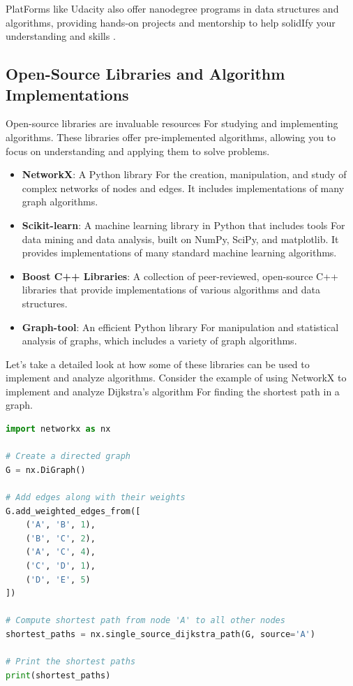 \documentclass[12pt]{book} %
\begin{document}
PlatForms like Udacity also offer nanodegree programs in data structures and algorithms, providing hands-on projects and mentorship to help solidIfy your understanding and skills .

\subsection{Open-Source Libraries and Algorithm Implementations}
Open-source libraries are invaluable resources For studying and implementing algorithms. These libraries offer pre-implemented algorithms, allowing you to focus on understanding and applying them to solve problems.

\begin{itemize}
    \item \textbf{NetworkX}: A Python library For the creation, manipulation, and study of complex networks of nodes and edges. It includes implementations of many graph algorithms.
    \item \textbf{Scikit-learn}: A machine learning library in Python that includes tools For data mining and data analysis, built on NumPy, SciPy, and matplotlib. It provides implementations of many standard machine learning algorithms.
    \item \textbf{Boost C++ Libraries}: A collection of peer-reviewed, open-source C++ libraries that provide implementations of various algorithms and data structures.
    \item \textbf{Graph-tool}: An efficient Python library For manipulation and statistical analysis of graphs, which includes a variety of graph algorithms.
\end{itemize}

Let's take a detailed look at how some of these libraries can be used to implement and analyze algorithms. Consider the example of using NetworkX to implement and analyze Dijkstra's algorithm For finding the shortest path in a graph.

\FloatBarrier
\begin{lstlisting}[language=Python, caption=Using NetworkX to Implement Dijkstra's Algorithm]
import networkx as nx

# Create a directed graph
G = nx.DiGraph()

# Add edges along with their weights
G.add_weighted_edges_from([
    ('A', 'B', 1),
    ('B', 'C', 2),
    ('A', 'C', 4),
    ('C', 'D', 1),
    ('D', 'E', 5)
])

# Compute shortest path from node 'A' to all other nodes
shortest_paths = nx.single_source_dijkstra_path(G, source='A')

# Print the shortest paths
print(shortest_paths)
\end{lstlisting}
\FloatBarrier
\end{document}
